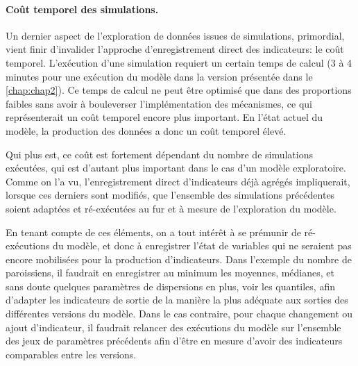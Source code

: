\paragraph{Coût temporel des simulations.}
Un dernier aspect de l'exploration de données issues de simulations, primordial, vient finir d'invalider l'approche d'enregistrement direct des indicateurs: le coût temporel.
L'exécution d'une simulation requiert un certain temps de calcul (3 à 4 minutes pour une exécution du modèle \simfeodal{} dans la version présentée dans le \cref{chap:chap2}).
Ce temps de calcul ne peut être optimisé que dans des proportions faibles sans avoir à bouleverser l'implémentation des mécanismes, ce qui représenterait un coût temporel encore plus important.
En l'état actuel du modèle, la production des données a donc un coût temporel élevé.

Qui plus est, ce coût est fortement dépendant du nombre de simulations exécutées, qui est d'autant plus important dans le cas d'un modèle exploratoire.
Comme on l'a vu, l'enregistrement direct d'indicateurs déjà agrégés impliquerait, lorsque ces derniers sont modifiés, que l'ensemble des simulations précédentes soient adaptées et ré-exécutées au fur et à mesure de l'exploration du modèle.

En tenant compte de ces éléments, on a tout intérêt à se prémunir de ré-exécutions du modèle, et donc à enregistrer l'état de variables qui ne seraient pas encore mobilisées pour la production d'indicateurs.	
Dans l'exemple du nombre de paroissiens, il faudrait en enregistrer au minimum les moyennes, médianes, et sans doute quelques paramètres de dispersions en plus, voir les quantiles, afin d'adapter les indicateurs de sortie de la manière la plus adéquate aux sorties des différentes versions du modèle.
Dans le cas contraire, pour chaque changement ou ajout d'indicateur, il faudrait relancer des exécutions du modèle sur l'ensemble des jeux de paramètres précédents afin d'être en mesure d'avoir des indicateurs comparables entre les versions.

